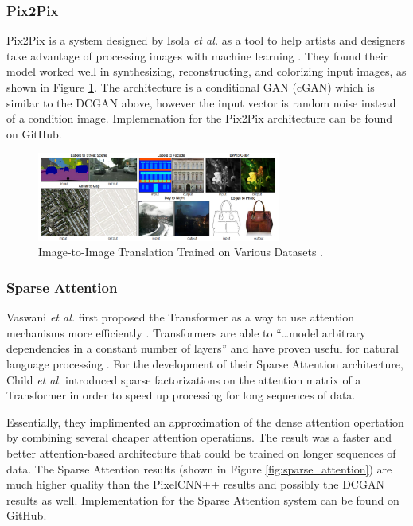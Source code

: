 \documentclass[letterpaper]{article} %
\begin{document}
\subsubsection{Pix2Pix}
Pix2Pix is a system designed by Isola \textit{et al.} 
as a tool to help artists and designers take advantage of processing images with machine learning
\cite{image_to_image}.
They found their model worked well in synthesizing, reconstructing, and colorizing
input images, as shown in Figure \ref{fig:image_to_image}.
The architecture is a conditional GAN (cGAN) which is similar to the DCGAN above, however
the input vector is random noise instead of a condition image.
Implemenation for the Pix2Pix architecture can be found on GitHub.

\begin{figure}[htbp]
\centerline{\includegraphics[width=8cm]{image_to_image.png}}
\caption{Image-to-Image Translation Trained on Various Datasets \cite{image_to_image}.}
\label{fig:image_to_image}
\end{figure}

\subsubsection{Sparse Attention}
Vaswani \textit{et al.} first proposed the Transformer
as a way to use attention mechanisms more efficiently
\cite{attention_need}.
Transformers are able to
``\dots model arbitrary dependencies
in a constant number of layers''
and have proven useful for natural language processing \cite{generative_transformers}.
For the development of their Sparse Attention architecture,
Child \textit{et al.} introduced sparse factorizations on the attention matrix
of a Transformer in order to speed up processing for long sequences of
data.

Essentially, they implimented an approximation of the dense attention
opertation by combining several cheaper attention operations.
The result was a faster and better attention-based architecture
that could be trained on longer sequences of data.
The Sparse Attention results (shown in Figure \ref{fig:sparse_attention}) are
much higher quality than the PixelCNN++ results and possibly
the DCGAN results as well.
Implementation for the Sparse Attention system can be found on GitHub.
\end{document}
